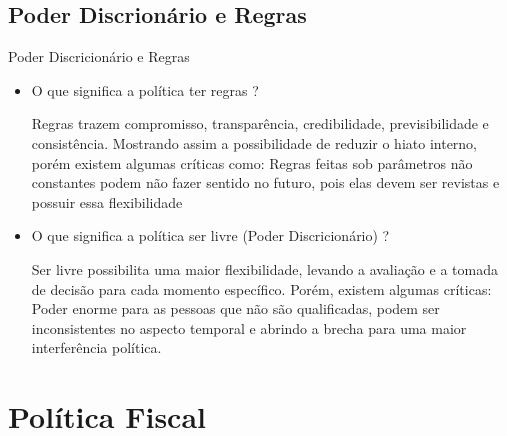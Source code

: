 \documentclass[xcolor=dvipsnames]{beamer}
\begin{document}
\subsection{Poder Discrionário e Regras}
\begin{frame}{Poder Discricionário e Regras}
\begin{itemize}
    \item O que significa a política ter regras ? 
    
    Regras trazem compromisso, transparência, credibilidade, previsibilidade e consistência. Mostrando assim a possibilidade de reduzir o hiato interno, porém existem algumas críticas como: Regras feitas sob parâmetros não constantes podem não fazer sentido no futuro, pois elas devem ser revistas e possuir essa flexibilidade
    \item O que significa a política ser livre (Poder Discricionário) ? 
    
    Ser livre possibilita uma maior flexibilidade, levando a avaliação e a tomada de decisão para cada momento específico. Porém, existem algumas críticas: Poder enorme para as pessoas que não são qualificadas, podem ser inconsistentes no aspecto temporal e abrindo a brecha para uma maior interferência política. 
\end{itemize}
    
\end{frame}

\section{Política Fiscal}
\end{document}
